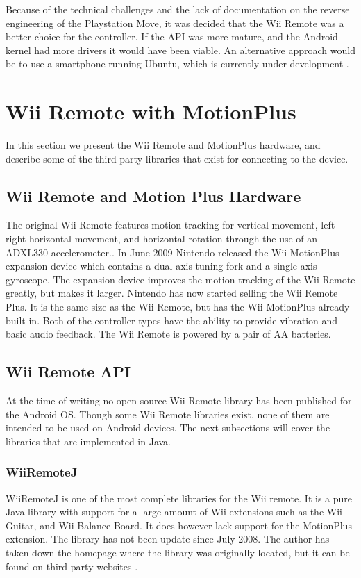 Because of the technical challenges and the lack of documentation on the reverse engineering of the Playstation Move, it was decided that the Wii Remote was a better choice for the controller. If the API was more mature, and the Android kernel had more drivers it would have been viable. An alternative approach would be to use a smartphone running Ubuntu, which is currently under development \cite{ubuntuAndroid}.

\section{Wii Remote with MotionPlus}
In this section we present the Wii Remote and MotionPlus hardware, and describe some of the third-party libraries that exist for connecting to the device.

\subsection{Wii Remote and Motion Plus Hardware}
The original Wii Remote features motion tracking for vertical movement, left-right horizontal movement, and horizontal rotation through the use of an ADXL330 accelerometer.\cite{wiiAccelerometer}. In June 2009 Nintendo released the Wii MotionPlus expansion device which contains a dual-axis tuning fork and a single-axis gyroscope\cite{wiiMotionPlus}. The expansion device improves the motion tracking of the Wii Remote greatly, but makes it larger. Nintendo has now started selling the Wii Remote Plus. It is the same size as the Wii Remote, but has the Wii MotionPlus already built in. Both of the controller types have the ability to provide vibration and basic audio feedback. The Wii Remote is powered by a pair of AA batteries.

\subsection{Wii Remote API}
At the time of writing no open source Wii Remote library has been published for the Android OS. Though some Wii Remote libraries exist, none of them are intended to be used on Android devices. The next subsections will cover the libraries that are implemented in Java.

\subsubsection{WiiRemoteJ}
WiiRemoteJ is one of the most complete libraries for the Wii remote. It is a pure Java library with support for a large amount of Wii extensions such as the Wii Guitar, and Wii Balance Board. It does however lack support for the MotionPlus extension. The library has not been update since July 2008. The author has taken down the homepage where the library was originally located, but it can be found on third party websites \cite{WiiRemoteJ}.

